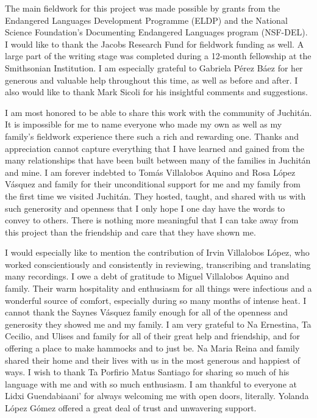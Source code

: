 \begin{refsection}
The main fieldwork for this project was made possible by grants from the Endangered Languages Development Programme (ELDP) and the National Science Foundation's Documenting Endangered Languages program (NSF-DEL). I would like to thank the Jacobs Research Fund for fieldwork funding as well. A large part of the writing stage was completed during a 12-month fellowship at the Smithsonian Institution. I am especially grateful to Gabriela P\'{e}rez B\'{a}ez for her generous and valuable help throughout this time, as well as before and after. I also would like to thank Mark Sicoli for his insightful comments and suggestions.


I am most honored to be able to share this work with the community of Juchit\'{a}n. It is impossible for me to name everyone who made my own as well as my family’s fieldwork experience there such a rich and rewarding one. Thanks and appreciation cannot capture everything that I have learned and gained from the many relationships that have been built between many of the families in Juchit\'{a}n and mine. I am forever indebted to Tom\'{a}s Villalobos Aquino and Rosa L\'{o}pez V\'{a}squez and family for their unconditional support for me and my family from the first time we visited Juchit\'{a}n. They hosted, taught, and shared with us with such generosity and openness that I only hope I one day have the words to convey to others. There is nothing more meaningful that I can take away from this project than the friendship and care that they have shown me.

I would especially like to mention the contribution of Irvin Villalobos L\'{o}pez, who worked conscientiously and consistently in reviewing, transcribing and translating many recordings. I owe a debt of gratitude to Miguel Villalobos Aquino and family. Their warm hospitality and enthusiasm for all things were infectious and a wonderful source of comfort, especially during so many months of intense heat. I cannot thank the Saynes V\'{a}squez family enough for all of the openness and generosity they showed me and my family. I am very grateful to Na Ernestina, Ta Cecilio, and Ulises and family for all of their great help and friendship, and for offering a place to make hammocks and to just be. Na Maria Reina and family shared their home and their lives with us in the most generous and happiest of ways. I wish to thank Ta Porfirio Matus Santiago for sharing so much of his language with me and with so much enthusiasm. I am thankful to everyone at Lidxi Guendabiaani’ for always welcoming me with open doors, literally. Yolanda L\'{o}pez G\'{o}mez offered a great deal of trust and unwavering support. 


\end{refsection}
